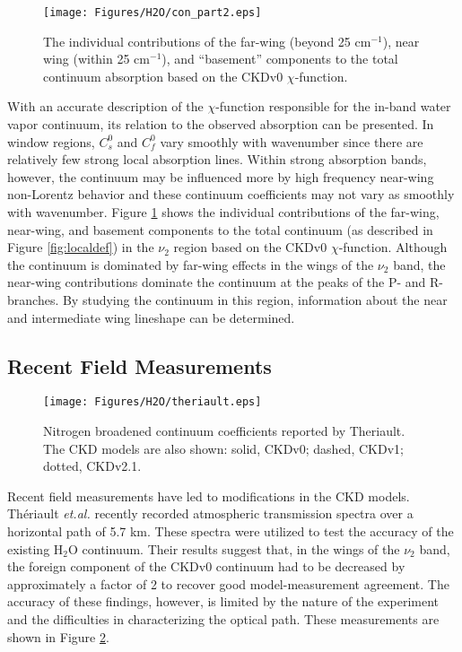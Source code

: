 \documentclass[11pt]{article}
\begin{document}
\begin{figure}[h]
\begin{center}
  \texttt{[image: Figures/H2O/con\_part2.eps]}\end{center}
  \caption[Far-wing, near-wing, and basement contributions to the total continuum.]
	{The individual contributions of the far-wing 
    (beyond 25 cm$^{-1}$), near wing (within 25 cm$^{-1}$), and 
    ``basement'' components to the total continuum
    absorption based on the CKDv0 $\chi$-function.}
  \label{fig:parts}
\end{figure}

With an accurate description of the $\chi$-function responsible for the
in-band water vapor continuum, its relation to the observed absorption can
be presented.  In window regions, $C_s^0$ and $C_f^0$ vary smoothly with 
wavenumber since there are relatively few strong local absorption lines.  
Within strong absorption 
bands, however, the continuum may be influenced more by high frequency 
near-wing non-Lorentz behavior and these continuum coefficients may not 
vary as smoothly with wavenumber.  Figure \ref{fig:parts} shows the 
individual contributions of the far-wing, near-wing, and basement components 
to the total continuum (as described in Figure \ref{fig:localdef}) in the 
$\nu_2$ region based on the CKDv0 $\chi$-function.  Although the 
continuum is dominated by far-wing effects in the wings of the $\nu_2$ band, 
the near-wing contributions dominate the continuum at the peaks of the P- and 
R-branches.  By studying the continuum in this region, information about the
near and intermediate wing lineshape can be determined.


\subsection{Recent Field Measurements}

\begin{figure}[h]
\begin{center}\texttt{[image: Figures/H2O/theriault.eps]}
\end{center}
  \caption[Nitrogen broadened continuum coefficients reported by
	Theriault.]{Nitrogen broadened continuum coefficients reported by
	Theriault. The CKD models are also shown: solid, CKDv0; dashed,
	CKDv1; dotted, CKDv2.1.}
  \label{fig:theriault1}
\end{figure}

Recent field measurements have led to modifications in the CKD models.
Th\'{e}riault {\it et.al.} \cite{the:94} recently recorded 
atmospheric transmission spectra over a horizontal path of 5.7 km.  These
spectra were utilized to test the accuracy of the existing H$_2$O
continuum.  Their results suggest that, in the wings of the $\nu_2$ band,
the foreign component of the CKDv0 continuum had to be decreased by
approximately a factor of 2 to recover good model-measurement agreement.
The accuracy of these findings, however, is limited by the nature of the
experiment and the difficulties in characterizing the optical path.
These measurements are shown in Figure \ref{fig:theriault1}.
\end{document}
